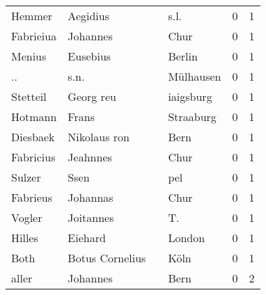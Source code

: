 \begin{tabular}{llllrr}
                   Hemmer &                           Aegidius &             &                                        s.l. &          0 &         1 \\
                Fabrieiua &                           Johannes &             &                                        Chur &          0 &         1 \\
                   Menius &                           Eusebius &             &                                      Berlin &          0 &         1 \\
                       .. &                               s.n. &             &                                   Mülhausen &          0 &         1 \\
                 Stetteil &                          Georg reu &             &                                   iaigsburg &          0 &         1 \\
                  Hotmann &                              Frans &             &                                   Straaburg &          0 &         1 \\
                 Diesbaek &                       Nikolaus ron &             &                                        Bern &          0 &         1 \\
                Fabricius &                           Jeahnnes &             &                                        Chur &          0 &         1 \\
                   Sulzer &                               Ssen &             &                                         pel &          0 &         1 \\
                 Fabrieus &                           Johannas &             &                                        Chur &          0 &         1 \\
                   Vogler &                          Joitannes &             &                                         T.  &          0 &         1 \\
                   Hilles &                            Eiehard &             &                                      London &          0 &         1 \\
                     Both &                    Botus Cornelius &             &                                        Köln &          0 &         1 \\
                    aller &                           Johannes &             &                                        Bern &          0 &         2 \\

\end{tabular}
